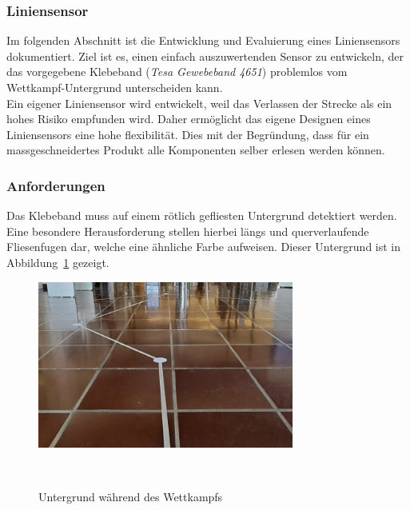 \documentclass[main.tex]{subfiles} %
\begin{document}

\subsubsection{Liniensensor}

Im folgenden Abschnitt ist die Entwicklung und Evaluierung eines Liniensensors
dokumentiert. Ziel ist es, einen einfach auszuwertenden Sensor zu entwickeln,
der das vorgegebene Klebeband (\textit{Tesa Gewebeband 4651}) problemlos vom Wettkampf-Untergrund unterscheiden kann.\\
Ein eigener Liniensensor wird entwickelt, weil das Verlassen der Strecke als ein hohes Risiko empfunden wird. Daher ermöglicht
das eigene Designen eines Liniensensors eine hohe flexibilität. Dies mit der Begründung, dass für ein massgeschneidertes Produkt 
alle Komponenten selber erlesen werden können.


\subsubsection*{Anforderungen}

Das Klebeband muss auf einem rötlich
gefliesten Untergrund detektiert werden. Eine besondere Herausforderung
stellen hierbei längs und querverlaufende Fliesenfugen dar, welche eine
ähnliche Farbe aufweisen. Dieser Untergrund ist in
Abbildung~\ref{fig:Untergrund_Wettkampf} gezeigt.

\begin{figure}[H]
    \centering
    \includegraphics[width=0.75\textwidth]{fig_Strecke_Tracken/Bild_Untergrund.jpg}
    \caption{Untergrund während des Wettkampfs}~\label{fig:Untergrund_Wettkampf}
\end{figure}

\end{document}
